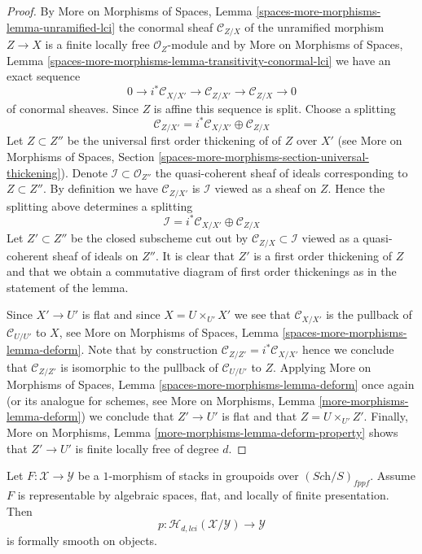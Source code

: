 \begin{proof}
By
More on Morphisms of Spaces,
Lemma \ref{spaces-more-morphisms-lemma-unramified-lci}
the conormal sheaf $\mathcal{C}_{Z/X}$ of the unramified morphism $Z \to X$
is a finite locally free $\mathcal{O}_Z$-module and by
More on Morphisms of Spaces,
Lemma \ref{spaces-more-morphisms-lemma-transitivity-conormal-lci}
we have an exact sequence
$$
0 \to i^*\mathcal{C}_{X/X'} \to
\mathcal{C}_{Z/X'} \to
\mathcal{C}_{Z/X} \to 0
$$
of conormal sheaves. Since $Z$ is affine this sequence is split. Choose
a splitting
$$
\mathcal{C}_{Z/X'} = i^*\mathcal{C}_{X/X'} \oplus \mathcal{C}_{Z/X}
$$
Let $Z \subset Z''$ be the universal first order thickening of of $Z$
over $X'$ (see
More on Morphisms of Spaces,
Section \ref{spaces-more-morphisms-section-universal-thickening}).
Denote $\mathcal{I} \subset \mathcal{O}_{Z''}$ the quasi-coherent sheaf
of ideals corresponding to $Z \subset Z''$. By definition we have
$\mathcal{C}_{Z/X'}$ is $\mathcal{I}$ viewed as a sheaf on $Z$.
Hence the splitting above determines a splitting
$$
\mathcal{I} = i^*\mathcal{C}_{X/X'} \oplus \mathcal{C}_{Z/X}
$$
Let $Z' \subset Z''$ be the closed subscheme cut out by
$\mathcal{C}_{Z/X} \subset \mathcal{I}$ viewed as a quasi-coherent sheaf
of ideals on $Z''$. It is clear that $Z'$ is a first order thickening
of $Z$ and that we obtain a commutative diagram of first order thickenings
as in the statement of the lemma.

\medskip\noindent
Since $X' \to U'$ is flat and since $X = U \times_{U'} X'$ we see that
$\mathcal{C}_{X/X'}$ is the pullback of $\mathcal{C}_{U/U'}$ to $X$, see
More on Morphisms of Spaces, Lemma \ref{spaces-more-morphisms-lemma-deform}.
Note that by construction $\mathcal{C}_{Z/Z'} = i^*\mathcal{C}_{X/X'}$
hence we conclude that $\mathcal{C}_{Z/Z'}$ is isomorphic to the pullback
of $\mathcal{C}_{U/U'}$ to $Z$. Applying
More on Morphisms of Spaces, Lemma \ref{spaces-more-morphisms-lemma-deform}
once again (or its analogue for schemes, see
More on Morphisms, Lemma \ref{more-morphisms-lemma-deform})
we conclude that $Z' \to U'$ is flat and that $Z = U \times_{U'} Z'$.
Finally,
More on Morphisms, Lemma \ref{more-morphisms-lemma-deform-property}
shows that $Z' \to U'$ is finite locally free of degree $d$.
\end{proof}

\begin{lemma}
\label{lemma-lci-formally-smooth}
Let $F : \mathcal{X} \to \mathcal{Y}$ be a $1$-morphism of stacks in groupoids
over $(\textit{Sch}/S)_{fppf}$. Assume $F$ is representable by algebraic
spaces, flat, and locally of finite presentation. Then
$$
p : \mathcal{H}_{d, lci}(\mathcal{X}/\mathcal{Y}) \to \mathcal{Y}
$$
is formally smooth on objects.
\end{lemma}

